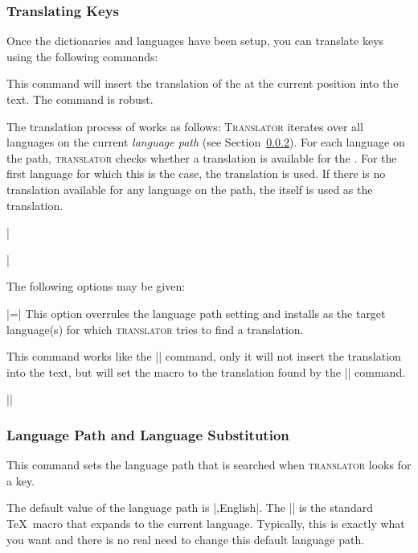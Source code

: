 \subsubsection{Translating Keys}

Once the dictionaries and languages have been setup, you can translate keys using the following commands:

\begin{command}{\translate{}}
  This command will insert the translation of the  at the current position into the text. The command is robust.

  The translation process of  works as follows: \textsc{Translator} iterates over all languages on the current \emph{language  path} (see Section~\ref{section-language-path}). For each language on the path, \textsc{translator} checks whether a translation is available for the . For the first language for which this is the case, the translation is used. If there is no translation available for any language on the path, the  itself is used as the translation.

  \example
  |\caption{~2.}|

  The following options may be given:
  \begin{itemize}
    |=| This option overrules the language path setting and installs  as the target language(s) for which \textsc{translator} tries to find a translation.
  \end{itemize}
\end{command}

\begin{command}{\translatelet{}}
  This command works like the |\translate| command, only it will not insert the translation into the text, but will set the macro  to the translation found by the |\translate| command.

  \example
  |\translatelet{}|
\end{command}

\subsubsection{Language Path and Language Substitution}
\label{section-language-path}

\begin{command}{\languagepath{}}
  This command sets the language path that is searched when \textsc{translator} looks for a key. 

  The default value of the language path is |\languagename,English|. The |\languagename| is the standard \TeX\ macro that expands to the current language. Typically, this is exactly what you want and there is no real need to change this default language path.
\end{command}

